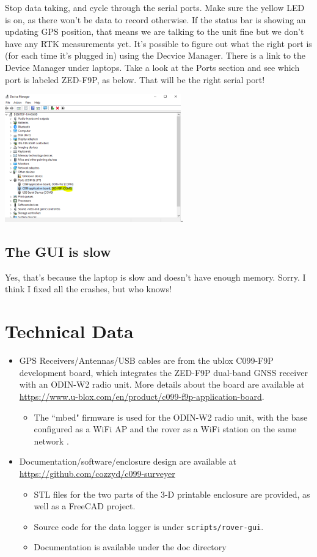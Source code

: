 \documentclass[usletter]{article}
\begin{document}
Stop data taking, and cycle through the serial ports.  Make sure the yellow LED is on, as there  won't be  data to record otherwise. If the status bar is showing an updating GPS position, that means we are talking to the unit fine but we don't have any RTK measurements yet. 
It's possible to figure out what the right port is (for each time it's plugged in) using the Decvice Manager. There is a link to the Device Manager under laptops. Take a look at the Ports section and see which port is labeled ZED-F9P, as below. That will be the right serial port! 
\begin{center}
\includegraphics[width=3in]{device_manager}. 
\end{center}

\subsection{The GUI is slow} 

Yes, that's because the laptop is slow and doesn't have enough memory. Sorry. I think I fixed all the crashes, but who knows! 


\section{Technical Data} 

\begin{itemize} 

\item GPS Receivers/Antennas/USB cables are from the ublox C099-F9P development board, which integrates the ZED-F9P dual-band GNSS receiver with an ODIN-W2 radio unit. More details about the board are available at \url{https://www.u-blox.com/en/product/c099-f9p-application-board}. 
\begin{itemize} 
\item The ``mbed" firmware is used for the ODIN-W2 radio unit, with the base configured as a WiFi AP and the rover as a WiFi station on the same network .

\end{itemize} 
\item Documentation/software/enclosure design are available at \url{https://github.com/cozzyd/c099-surveyer} 
\begin{itemize} 
\item STL files for the two parts of the 3-D printable enclosure are provided, as well as a FreeCAD project. 
\item Source code for the data logger is under \texttt{scripts/rover-gui}. 
\item Documentation is available under the doc directory 
\end{itemize} 
\end{itemize} 
\end{document}
